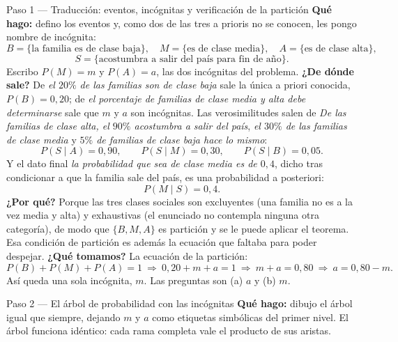 \documentclass[11pt]{article}
\begin{document}
\begin{sol}

\begin{paso}{Paso 1 --- Traducción: eventos, incógnitas y verificación de la partición}
\textbf{Qué hago:} defino los eventos y, como dos de las tres a prioris no se conocen, les pongo nombre de incógnita:
\[
B=\{\text{la familia es de clase baja}\},\quad M=\{\text{es de clase media}\},\quad A=\{\text{es de clase alta}\},
\]
\[
S=\{\text{acostumbra a salir del país para fin de año}\}.
\]
Escribo $P(M)=m$ y $P(A)=a$, las dos incógnitas del problema.
\textbf{¿De dónde sale?} De \emph{el $20\%$ de las familias son de clase baja} sale la única a priori conocida, $P(B)=0,20$; de \emph{el porcentaje de familias de clase media y alta debe determinarse} sale que $m$ y $a$ son incógnitas. Las verosimilitudes salen de \emph{De las familias de clase alta, el $90\%$ acostumbra a salir del país}, \emph{el $30\%$ de las familias de clase media} y \emph{$5\%$ de familias de clase baja hace lo mismo}:
\[
P(S\mid A)=0,90,\qquad P(S\mid M)=0,30,\qquad P(S\mid B)=0,05 .
\]
Y el dato final \emph{la probabilidad que sea de clase media es de $0,4$}, dicho tras condicionar a que la familia sale del país, es una probabilidad a posteriori:
\[
P(M\mid S)=0,4 .
\]
\textbf{¿Por qué?} Porque las tres clases sociales son excluyentes (una familia no es a la vez media y alta) y exhaustivas (el enunciado no contempla ninguna otra categoría), de modo que $\{B,M,A\}$ es partición y se le puede aplicar el teorema. Esa condición de partición es además la ecuación que faltaba para poder despejar.
\textbf{¿Qué tomamos?} La ecuación de la partición:
\[
P(B)+P(M)+P(A)=1\ \Longrightarrow\ 0,20+m+a=1\ \Longrightarrow\ m+a=0,80 \ \Longrightarrow\ a=0,80-m .
\]
Así queda una sola incógnita, $m$. Las preguntas son (a) $a$ y (b) $m$.
\end{paso}

\begin{paso}{Paso 2 --- El árbol de probabilidad con las incógnitas}
\textbf{Qué hago:} dibujo el árbol igual que siempre, dejando $m$ y $a$ como etiquetas simbólicas del primer nivel. El árbol funciona idéntico: cada rama completa vale el producto de sus aristas.

\begin{center}
\shorthandoff{<>}
\end{center}
\end{paso}
\end{sol}
\end{document}

